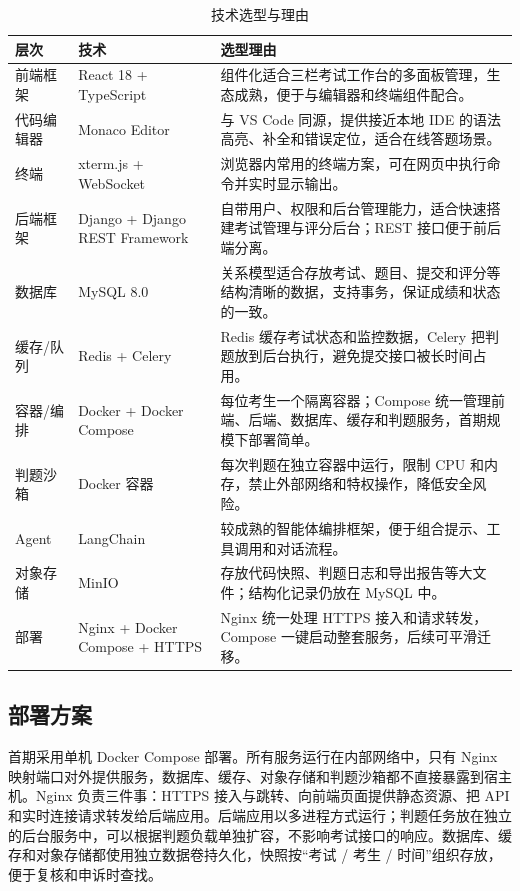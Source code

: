 \documentclass[UTF8,12pt,a4paper]{ctexart}
\begin{document}
\begin{table}[H]
\centering
\caption{技术选型与理由}
\label{tab:techstack}
\small
\begin{tabularx}{\textwidth}{|p{2.8cm}|p{4.0cm}|Y|}
\hline
\textbf{层次} & \textbf{技术} & \textbf{选型理由} \\ \hline
前端框架 & React 18 + TypeScript & 组件化适合三栏考试工作台的多面板管理，生态成熟，便于与编辑器和终端组件配合。 \\ \hline
代码编辑器 & Monaco Editor & 与 VS Code 同源，提供接近本地 IDE 的语法高亮、补全和错误定位，适合在线答题场景。 \\ \hline
终端 & xterm.js + WebSocket & 浏览器内常用的终端方案，可在网页中执行命令并实时显示输出。 \\ \hline
后端框架 & Django + Django REST Framework & 自带用户、权限和后台管理能力，适合快速搭建考试管理与评分后台；REST 接口便于前后端分离。 \\ \hline
数据库 & MySQL 8.0 & 关系模型适合存放考试、题目、提交和评分等结构清晰的数据，支持事务，保证成绩和状态的一致。 \\ \hline
缓存/队列 & Redis + Celery & Redis 缓存考试状态和监控数据，Celery 把判题放到后台执行，避免提交接口被长时间占用。 \\ \hline
容器/编排 & Docker + Docker Compose & 每位考生一个隔离容器；Compose 统一管理前端、后端、数据库、缓存和判题服务，首期规模下部署简单。 \\ \hline
判题沙箱 & Docker 容器 & 每次判题在独立容器中运行，限制 CPU 和内存，禁止外部网络和特权操作，降低安全风险。 \\ \hline
Agent & LangChain & 较成熟的智能体编排框架，便于组合提示、工具调用和对话流程。 \\ \hline
对象存储 & MinIO & 存放代码快照、判题日志和导出报告等大文件；结构化记录仍放在 MySQL 中。 \\ \hline
部署 & Nginx + Docker Compose + HTTPS & Nginx 统一处理 HTTPS 接入和请求转发，Compose 一键启动整套服务，后续可平滑迁移。 \\ \hline
\end{tabularx}
\end{table}

\subsection{部署方案}

首期采用单机 Docker Compose 部署。所有服务运行在内部网络中，只有 Nginx 映射端口对外提供服务，数据库、缓存、对象存储和判题沙箱都不直接暴露到宿主机。Nginx 负责三件事：HTTPS 接入与跳转、向前端页面提供静态资源、把 API 和实时连接请求转发给后端应用。后端应用以多进程方式运行；判题任务放在独立的后台服务中，可以根据判题负载单独扩容，不影响考试接口的响应。数据库、缓存和对象存储都使用独立数据卷持久化，快照按“考试 / 考生 / 时间”组织存放，便于复核和申诉时查找。
\end{document}
